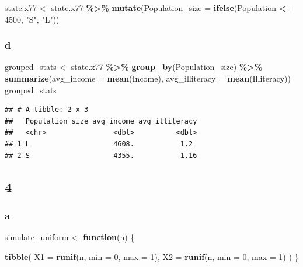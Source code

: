 \documentclass[
]{article}
\newenvironment{Shaded}{\begin{snugshade}}{\end{snugshade}}
\newcommand{\AttributeTok}[1]{\textcolor[rgb]{0.13,0.29,0.53}{#1}}
\newcommand{\ControlFlowTok}[1]{\textcolor[rgb]{0.13,0.29,0.53}{\textbf{#1}}}
\newcommand{\DecValTok}[1]{\textcolor[rgb]{0.00,0.00,0.81}{#1}}
\newcommand{\FunctionTok}[1]{\textcolor[rgb]{0.13,0.29,0.53}{\textbf{#1}}}
\newcommand{\NormalTok}[1]{#1}
\newcommand{\OtherTok}[1]{\textcolor[rgb]{0.56,0.35,0.01}{#1}}
\newcommand{\SpecialCharTok}[1]{\textcolor[rgb]{0.81,0.36,0.00}{\textbf{#1}}}
\newcommand{\StringTok}[1]{\textcolor[rgb]{0.31,0.60,0.02}{#1}}
\begin{document}
\begin{Shaded}
\begin{Highlighting}[]
\NormalTok{state.x77 }\OtherTok{\textless{}{-}}\NormalTok{ state.x77 }\SpecialCharTok{\%\textgreater{}\%} 
  \FunctionTok{mutate}\NormalTok{(}\AttributeTok{Population\_size =} \FunctionTok{ifelse}\NormalTok{(Population }\SpecialCharTok{\textless{}=} \DecValTok{4500}\NormalTok{, }\StringTok{"S"}\NormalTok{, }\StringTok{"L"}\NormalTok{))}
\end{Highlighting}
\end{Shaded}

\subsubsection{d}\label{d-1}

\begin{Shaded}
\begin{Highlighting}[]
\NormalTok{grouped\_stats }\OtherTok{\textless{}{-}}\NormalTok{ state.x77 }\SpecialCharTok{\%\textgreater{}\%} 
  \FunctionTok{group\_by}\NormalTok{(Population\_size) }\SpecialCharTok{\%\textgreater{}\%} 
  \FunctionTok{summarize}\NormalTok{(}\AttributeTok{avg\_income =} \FunctionTok{mean}\NormalTok{(Income), }\AttributeTok{avg\_illiteracy =} \FunctionTok{mean}\NormalTok{(Illiteracy))}
\NormalTok{grouped\_stats}
\end{Highlighting}
\end{Shaded}

\begin{verbatim}
## # A tibble: 2 x 3
##   Population_size avg_income avg_illiteracy
##   <chr>                <dbl>          <dbl>
## 1 L                    4608.           1.2 
## 2 S                    4355.           1.16
\end{verbatim}

\subsection{4}\label{section-3}

\subsubsection{a}\label{a-2}

\begin{Shaded}
\begin{Highlighting}[]
\NormalTok{simulate\_uniform }\OtherTok{\textless{}{-}} \ControlFlowTok{function}\NormalTok{(n) \{}

  \FunctionTok{tibble}\NormalTok{(}
    \AttributeTok{X1 =} \FunctionTok{runif}\NormalTok{(n, }\AttributeTok{min =} \DecValTok{0}\NormalTok{, }\AttributeTok{max =} \DecValTok{1}\NormalTok{),}
    \AttributeTok{X2 =} \FunctionTok{runif}\NormalTok{(n, }\AttributeTok{min =} \DecValTok{0}\NormalTok{, }\AttributeTok{max =} \DecValTok{1}\NormalTok{)}
\NormalTok{  )}
\NormalTok{\}}
\end{Highlighting}
\end{Shaded}
\end{document}
